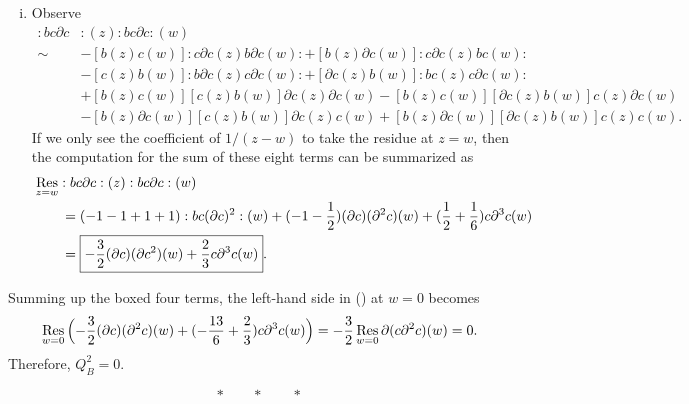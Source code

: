 \documentclass{../../../small}
\begin{document}
\begin{pf}[Solution of (3)]
\begin{enumerate}[(i)]
\item
Observe
\begin{align*}
:bc\partial c&:(z):bc\partial c:(w)\\
\sim&-[b(z)c(w)]:c\partial c(z)b\partial c(w):
+[b(z)\partial c(w)]:c\partial c(z)bc(w):\\
&-[c(z)b(w)]:b\partial c(z)c\partial c(w):
+[\partial c(z)b(w)]:bc(z)c\partial c(w):\\
&+[b(z)c(w)][c(z)b(w)]\partial c(z)\partial c(w)
-[b(z)c(w)][\partial c(z)b(w)]c(z)\partial c(w)\\
&-[b(z)\partial c(w)][c(z)b(w)]\partial c(z)c(w)
+[b(z)\partial c(w)][\partial c(z)b(w)]c(z)c(w).
\end{align*}
If we only see the coefficient of $1/(z-w)$ to take the residue at $z=w$, then the computation for the sum of these eight terms can be summarized as
\begin{align*}
&\operatorname*{Res}_{z=w}:bc\partial c:(z):bc\partial c:(w)\\
&\qquad=(-1-1+1+1):bc(\partial c)^2:(w)+(-1-\frac12)(\partial c)(\partial^2c)(w)+(\frac12+\frac16)c\partial^3c(w)\\
&\qquad=\boxed{-\frac32(\partial c)(\partial c^2)(w)+\frac23c\partial^3c(w)}.
\end{align*}
\end{enumerate}
Summing up the boxed four terms, the left-hand side in (\dagger) at $w=0$ becomes
\[\operatorname*{Res}_{w=0}\,\Bigl(-\frac32(\partial c)(\partial^2 c)(w)+(-\frac{13}6+\frac23)c\partial^3c(w)\Bigr)=-\frac32\operatorname*{Res}_{w=0}\partial(c\partial^2 c)(w)=0.\]
Therefore, $Q_B^2=0$.
\end{pf}

\[*\qquad*\qquad*\]
\smallskip
\end{document}
